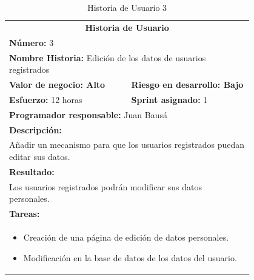 	\begin{table}[H]
	  \centering 
	 	\begin{tabular}{p{0.4\linewidth}p{0.4\linewidth}}
	    \toprule
	    \multicolumn{2}{c}{\cellcolor{black!30}\textbf{Historia de Usuario}} 													\\
		\multicolumn{2}{l}{\cellcolor{gray!25}\textbf{Número: }3}																\\
		\multicolumn{2}{l}{\textbf{Nombre Historia: } Edición de los datos de usuarios registrados}							\\
		\cellcolor{gray!25}\textbf{Valor de negocio: Alto}	&	\cellcolor{gray!25}\textbf{Riesgo en desarrollo: Bajo}			\\
		\textbf{Esfuerzo:} 12 horas				&	\textbf{Sprint asignado: }1 												\\
		\multicolumn{2}{l}{\cellcolor{gray!25}\textbf{Programador responsable: }Juan Bausá}									\\
		\multicolumn{2}{l}{\textbf{Descripción:}}                                                     						\\
		\multicolumn{2}{l}{	Añadir un mecanismo para que los usuarios registrados puedan editar sus datos.} 					\\
		\multicolumn{2}{l}{\cellcolor{gray!25}\textbf{Resultado:}}																\\
		\multicolumn{2}{l}{Los usuarios registrados podrán modificar sus datos personales.} 									\\
		\multicolumn{2}{l}{\textbf{Tareas:}}																					\\
		\multicolumn{2}{l}{
			\begin{minipage}{5in}
	    		\vskip 4pt
	    		\begin{itemize}
	    			\item Creación de una página de edición de datos personales.
	    			\item Modificación en la base de datos de los datos del usuario.
				\end{itemize}
			  	\vskip 4pt
		 	\end{minipage}
		} \\																				
	    \hline
	  \end{tabular}
	  \caption{Historia de Usuario 3}
	\end{table}

